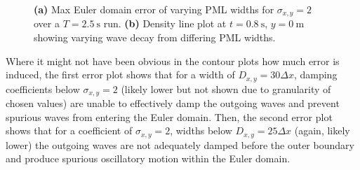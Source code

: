 \begin{figure}[h!]
    \centering
    \begin{subfigure}[h]{0.47\textwidth}
        \centering
        \caption{}
        \label{fig:WidthError}
    \end{subfigure}
    \hfill
    \begin{subfigure}[h]{0.47\textwidth}
        \centering
        \caption{}
        \label{fig:WidthLinePlot}
    \end{subfigure}
    \caption{\textbf{(a)} Max Euler domain error of varying PML widths for $\sigma_{x,y}=2$ over a $T=2.5 \ \mathrm{s}$ run. \textbf{(b)} Density line plot at $t=0.8 \ \mathrm{s}$, $y=0 \ \mathrm{m}$ showing varying wave decay from differing PML widths.}
    \label{fig:WidthAccessories}
\end{figure}

\newpage

Where it might not have been obvious in the contour plots how much error is induced, the first error plot shows that for a width of $D_{x,y}=30 \Delta x$, damping coefficients below $\sigma_{x,y}=2$ (likely lower but not shown due to granularity of chosen values) are unable to effectively damp the outgoing waves and prevent spurious waves from entering the Euler domain. Then, the second error plot shows that for a coefficient of $\sigma_{x,y}=2$, widths below $D_{x,y}=25 \Delta x$ (again, likely lower) the outgoing waves are not adequately damped before the outer boundary and produce spurious oscillatory motion within the Euler domain.



